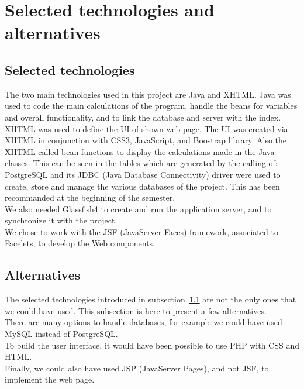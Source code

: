 \section{Selected technologies and alternatives}
\label{sec:techno}

\subsection{Selected technologies}
\label{ssec:select}

The two main technologies used in this project are Java and XHTML. Java was used to code the main calculations of the program, handle the beans for variables and overall functionality, and to link the database and server with the index. XHTML was used to define the UI of shown web page. The UI was created via XHTML in conjunction with CSS3, JavaScript, and Boostrap library. Also the XHTML called bean functions to display the calculations made in the Java classes. This can be seen in the tables which are generated by the calling of:\\

PostgreSQL and its JDBC (Java Database Connectivity) driver were used to create, store and manage the various databases of the project. This has been recommanded at the beginning of the semester.\\

We also needed Glassfish4 to create and run the application server, and to synchronize it with the project.\\

We chose to work with the JSF (JavaServer Faces)
framework, associated to Facelets, to develop the Web components.


\subsection{Alternatives}
\label{ssec:alter}

The selected technologies introduced in {\sc subsection}~\ref{ssec:select} are not the only ones that we could have used. This subsection is here to present a few alternatives.\\

There are many options to handle databases, for example we could have used MySQL instead of PostgreSQL.\\

To build the user interface, it would have been possible to use PHP with CSS and HTML.\\

Finally, we could also have used JSP (JavaServer Pages), and not JSF, to implement the web page.

